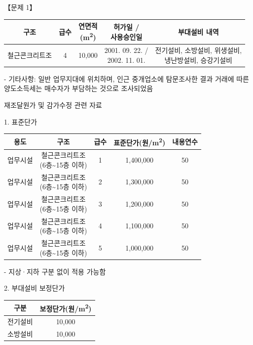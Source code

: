 \begin{longquestion}{【문제 1】}
{\begin{tabular}{|c|c|c|c|c|}
구조 & 급수 & \makecell{연면적\\(m\textsuperscript{2})} & \makecell{허가일 /\\사용승인일} & 부대설비 내역 \\\hline
철근콘크리트조 & 4 & 10,000 & \makecell{2001. 09. 22. /\\2002. 11. 01.} & \makecell{전기설비, 소방설비, 위생설비,\\냉난방설비, 승강기설비} \\\hline
\end{tabular}\par}
- 기타사항: 일반 업무지대에 위치하며, 인근 중개업소에 탐문조사한 결과 거래에 따른 양도소득세는 매수자가 부담하는 것으로 조사되었음 \par
\medskip{} 재조달원가 및 감가수정 관련 자료 \par
1. 표준단가 \par
{\small\centering
\begin{tabular}{|c|c|c|c|c|}\hline
용도 & 구조 & 급수 & 표준단가(원/m\textsuperscript{2}) & 내용연수 \\\hline
업무시설 & \makecell{철근콘크리트조\\(6층\textasciitilde{}15층 이하)} & 1 & 1,400,000 & 50 \\\hline
업무시설 & \makecell{철근콘크리트조\\(6층\textasciitilde{}15층 이하)} & 2 & 1,300,000 & 50 \\\hline
업무시설 & \makecell{철근콘크리트조\\(6층\textasciitilde{}15층 이하)} & 3 & 1,200,000 & 50 \\\hline
업무시설 & \makecell{철근콘크리트조\\(6층\textasciitilde{}15층 이하)} & 4 & 1,100,000 & 50 \\\hline
업무시설 & \makecell{철근콘크리트조\\(6층\textasciitilde{}15층 이하)} & 5 & 1,000,000 & 50 \\\hline
\end{tabular}\par}
- 지상·지하 구분 없이 적용 가능함 \par
2. 부대설비 보정단가 \par
{\small\centering
\begin{tabular}{|c|c|}\hline
구분 & 보정단가(원/m\textsuperscript{2}) \\\hline
전기설비 & 10,000 \\\hline
소방설비 & 10,000 \\\hline

\end{tabular}}
\end{longquestion}
